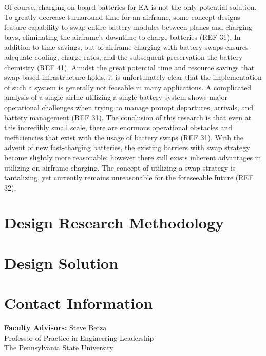 \documentclass{article}
\begin{document}
Of course, charging on-board batteries for EA is not the only potential solution. 
To greatly decrease turnaround time for an airframe, some concept designs feature capability to swap entire battery modules between planes and charging bays, eliminating the airframe’s downtime to charge batteries (REF 31). 
In addition to time savings, out-of-airframe charging with battery swaps ensures adequate cooling, charge rates, and the subsequent preservation the battery chemistry (REF 41). 
Amidst the great potential time and resource savings that swap-based infrastructure holds, it is unfortunately clear that the implementation of such a system is generally not feasable in many applications. 
A complicated analysis of a single airlne utilizing a single battery system shows major operational challenges when trying to manage prompt departures, arrivals, and battery management (REF 31). 
The conclusion of this research is that even at this incredibly small scale, there are enormous operational obstacles and inefficiencies that exist with the usage of battery swaps (REF 31). 
With the advent of new fast-charging batteries, the existing barriers with swap strategy become slightly more reasonable; however there still exists inherent advantages in utilizing on-airframe charging.  
The concept of utilizing a swap strategy is tantalizing, yet currently remains unreasonable for the foreseeable future (REF 32).\par



\newpage

\newpage

\section{Design Research Methodology}\label{designReview}
\blindtext

\section{Design Solution}\label{solution}
\blindtext 


\newpage
\appendixpage
\appendix
\section{Contact Information}\label{apxA}

\noindent\textbf{Faculty Advisors:}\newline
Steve Betza\\
Professor of Practice in Engineering Leadership\\
The Pennsylvania State University
\\~\\
\end{document}
